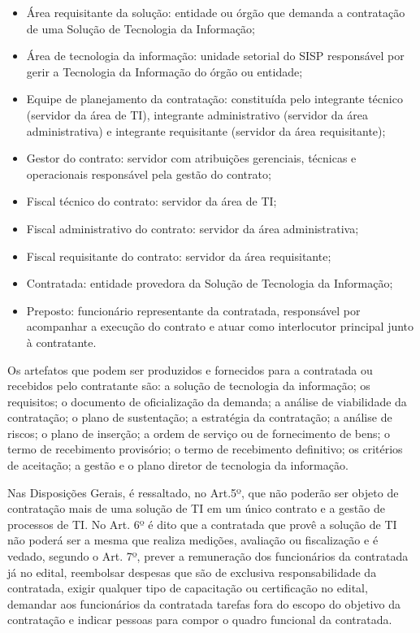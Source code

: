 \begin{itemize}
\item Área requisitante da solução: entidade ou órgão que demanda a contratação de uma Solução de Tecnologia da Informação; 
\item Área de tecnologia da informação: unidade setorial do SISP responsável por gerir a Tecnologia da Informação do órgão ou entidade;
\item Equipe de planejamento da contratação: constituída pelo integrante técnico (servidor da área de TI), integrante administrativo (servidor da área administrativa) e integrante requisitante (servidor da área requisitante);
\item Gestor do contrato: servidor com atribuições gerenciais, técnicas e operacionais responsável pela gestão do contrato; 
\item Fiscal técnico do contrato: servidor da área de TI; 
\item Fiscal administrativo do contrato: servidor da área administrativa; 
\item Fiscal requisitante do contrato: servidor da área requisitante;
\item Contratada: entidade provedora da Solução de Tecnologia da Informação;
\item Preposto: funcionário representante da contratada, responsável por acompanhar a execução do contrato e atuar como interlocutor principal junto à contratante.
\end{itemize}

Os artefatos que podem ser produzidos e fornecidos para a contratada ou recebidos pelo contratante são: a solução de tecnologia da informação; os requisitos; o documento de oficialização da demanda; a análise de viabilidade da contratação; o plano de sustentação; a estratégia da contratação; a análise de riscos; o plano de inserção; a ordem de serviço ou de fornecimento de bens; o termo de recebimento provisório; o termo de recebimento definitivo; os critérios de aceitação; a gestão e o plano diretor de tecnologia da informação.

Nas Disposições Gerais, é ressaltado, no Art.5º, que não poderão ser objeto de contratação mais de uma solução de TI em um único contrato e a gestão de processos de TI.  No Art. 6º é dito que a contratada que provê a solução de TI não poderá ser a mesma que realiza medições, avaliação ou fiscalização e é vedado, segundo o Art. 7º, prever a remuneração dos funcionários da contratada já no edital, reembolsar despesas que são de exclusiva responsabilidade da contratada, exigir qualquer tipo de capacitação ou certificação no edital, demandar aos funcionários da contratada tarefas fora do escopo do objetivo da contratação e indicar pessoas para compor o quadro funcional da contratada. 

